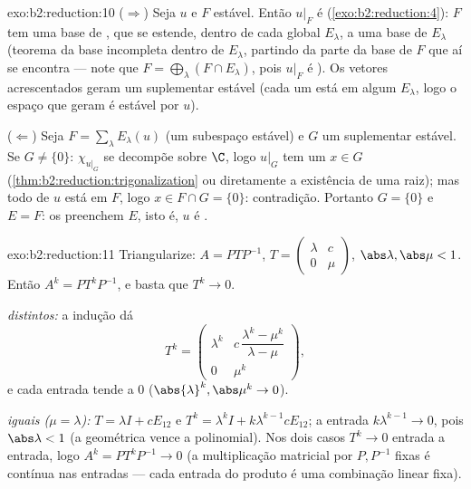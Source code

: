 \begin{solution}{exo:b2:reduction:10}
($\Rightarrow$) Seja $u$  e $F$ estável. Então
$u|_F$ é  (\cref{exo:b2:reduction:4}): $F$ tem uma
base de , que se estende, dentro de cada  global
$E_\lambda$, a uma base de $E_\lambda$ (teorema da base incompleta
dentro de $E_\lambda$, partindo da parte da base de $F$ que aí se encontra
--- note que $F = \bigoplus_\lambda (F \cap E_\lambda)$, pois
$u|_F$ é ). Os vetores acrescentados geram um
suplementar estável (cada um está em algum $E_\lambda$, logo o espaço que geram é
estável por $u$).

($\Leftarrow$) Seja $F = \sum_\lambda E_\lambda(u)$ (um subespaço
estável) e $G$ um suplementar estável. Se $G \neq \{0\}$: $\chi_{u|_G}$
se decompõe sobre $\C$, logo $u|_G$ tem um  $x \in G$
(\cref{thm:b2:reduction:trigonalization} ou diretamente a existência
de uma raiz); mas todo  de $u$ está em $F$, logo $x \in F
\cap G = \{0\}$: contradição. Portanto $G = \{0\}$ e $E = F$: os
 preenchem $E$, isto é, $u$ é .
\end{solution}

\begin{solution}{exo:b2:reduction:11}
Triangularize: $A = PTP^{-1}$, $T = \begin{pmatrix} \lambda & c\\ 0 &
\mu\end{pmatrix}$, $\abs\lambda, \abs\mu < 1$. Então $A^k =
PT^kP^{-1}$, e basta que $T^k \to 0$.

\emph{ distintos:} a indução dá
\[
T^k = \begin{pmatrix}
\lambda^k & c\,\dfrac{\lambda^k - \mu^k}{\lambda - \mu}\\[4pt]
0 & \mu^k
\end{pmatrix},
\]
e cada entrada tende a $0$ ($\abs{\lambda}^k, \abs\mu^k \to 0$).

\emph{ iguais ($\mu = \lambda$):} $T = \lambda I + cE_{12}$
e $T^k = \lambda^k I + k\lambda^{k-1}cE_{12}$; a entrada
$k\lambda^{k-1} \to 0$, pois $\abs\lambda < 1$ (a geométrica vence a
polinomial). Nos dois casos $T^k \to 0$ entrada a entrada, logo $A^k =
PT^kP^{-1} \to 0$ (a multiplicação matricial por $P, P^{-1}$ fixas é
contínua nas entradas --- cada entrada do produto é uma combinação
linear fixa).
\end{solution}

